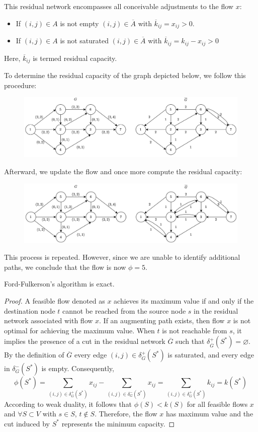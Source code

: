 This residual network encompasses all conceivable adjustments to the flow $x$: 
\begin{itemize}
    \item If $(i,j) \in A$ is not empty $(i,j) \in \overline{A}$ with $\overline{k}_{ij}=x_{ij}>0$.
    \item If $(i,j) \in A$ is not saturated $(i,j) \in \overline{A}$ with $\overline{k}_{ij}=k_{ij}-x_{ij}>0$
\end{itemize}
Here, $\overline{k}_{ij}$ is termed residual capacity. 
\begin{example}
    To determine the residual capacity of the graph depicted below, we follow this procedure:
    \begin{figure}[H]
        \centering
        \includegraphics[width=0.75\linewidth]{images/residual1.png}
    \end{figure}
    Afterward, we update the flow and once more compute the residual capacity:
    \begin{figure}[H]
        \centering
        \includegraphics[width=0.75\linewidth]{images/residual2.png}
    \end{figure}
    This process is repeated. 
    However, since we are unable to identify additional paths, we conclude that the flow is now $\phi=5$.
\end{example}
\begin{proposition}
    Ford-Fulkerson's algorithm is exact. 
\end{proposition}
\begin{proof}
    A feasible flow denoted as $x$  achieves its maximum value if and only if the destination node $t$ cannot be reached from the source node $s$ in the residual network associated with flow $x$. 
    If an augmenting path exists, then flow $x$ is not optimal for achieving the maximum value.
    When $t$ is not reachable from $s$, it implies the presence of a cut in the residual network $\overline{G}$ such that $\delta^{+}_{\overline{G}}(S^{*})=\varnothing$. 
    By the definition of $\overline{G}$  every edge $(i,j) \in \delta^{+}_{G}(S^{*})$ is saturated, and every edge in $\delta^{-}_{G}(S^{*})$ is empty. 
    Consequently,
    \[\phi(S^{*})=\sum_{(i,j) \in \delta^{+}_{G}(S^{*})}{x_{ij}}-\sum_{(i,j) \in \delta^{-}_{G}(S^{*})}{x_{ij}}= \sum_{(i,j) \in \delta^{+}_{G}(S^{*})}{k_{ij}}=k(S^{*})\]
    According to weak duality, it follows that $\phi(S) < k(S)$ for all feasible flows $x$ and $\forall S \subset V$ with $s \in S$, $t \notin S$. 
    Therefore, the flow $x$ has maximum value and the cut induced by $S^{*}$ represents the minimum capacity.
\end{proof}
